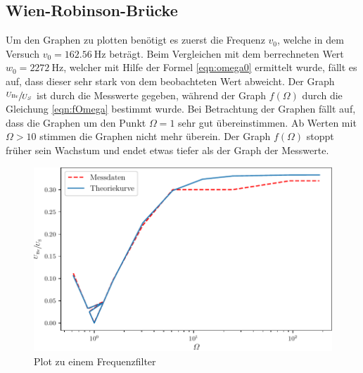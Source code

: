  \subsection{Wien-Robinson-Brücke}
 Um den Graphen zu plotten benötigt es zuerst die Frequenz $v_0$, welche in dem Versuch $v_0=\SI{162.56}{\hertz}$ beträgt.
 Beim Vergleichen mit dem berrechneten Wert $w_0= \SI{2272}{\hertz}$, welcher mit Hilfe der Formel \eqref{eqn:omega0} ermittelt wurde, fällt es auf, dass dieser
 sehr stark von dem beobachteten Wert abweicht.
Der Graph $\sfrac{U_\text{Br}}{U_S}$ ist durch die Messwerte gegeben, während der Graph $f(\Omega)$ durch die Gleichung \eqref{eqn:fOmega} bestimmt wurde. 
Bei Betrachtung der Graphen fällt auf, dass die Graphen um den Punkt $\Omega=1$ sehr gut übereinstimmen.
Ab Werten mit $\Omega>10$ stimmen die Graphen nicht mehr überein. Der Graph $f(\Omega)$ stoppt früher sein Wachstum und endet etwas tiefer als der Graph der Messwerte.
\begin{figure}
  \caption{Plot zu einem Frequenzfilter}
  \centering
  \includegraphics[width = \textwidth]{build/plot.pdf}
\end{figure}
